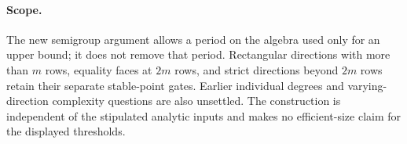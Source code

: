 \paragraph{Scope.}
The new semigroup argument allows a period on the algebra
used only for an upper bound; it does not remove that period.
Rectangular directions with more than $m$ rows, equality
faces at $2m$ rows, and strict directions beyond $2m$ rows
retain their separate stable-point gates. Earlier individual
degrees and varying-direction complexity questions are also
unsettled. The construction is independent of the stipulated
analytic inputs and makes no efficient-size claim for the
displayed thresholds.
